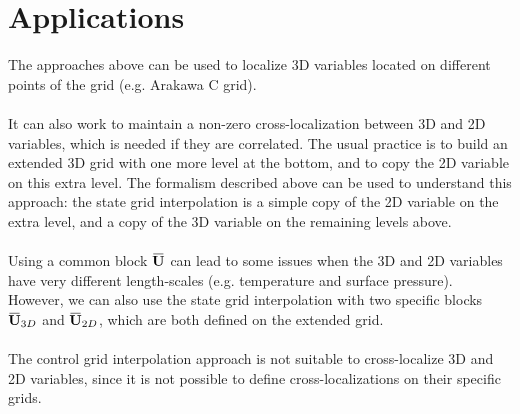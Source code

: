 \documentclass[12pt]{scrartcl}
\newcommand{\overbar}[1]{\mkern 1.5mu\overline{\mkern-1.5mu#1\mkern-1.5mu}\mkern 1.5mu}
\begin{document}
\section{Applications}
The approaches above can be used to localize 3D variables located on different points of the grid (e.g. Arakawa C grid).\\
$  $\\
It can also work to maintain a non-zero cross-localization between 3D and 2D variables, which is needed if they are correlated. The usual practice is to build an extended 3D grid with one more level at the bottom, and to copy the 2D variable on this extra level. The formalism described above can be used to understand this approach: the state grid interpolation is a simple copy of the 2D variable on the extra level, and a copy of the 3D variable on the remaining levels above.\\
$  $\\
Using a common block $\overbar{\mathbf{U}}$ can lead to some issues when the 3D and 2D variables have very different length-scales (e.g. temperature and surface pressure). However, we can also use the state grid interpolation with two specific blocks $\overbar{\mathbf{U}}_{3D}$ and $\overbar{\mathbf{U}}_{2D}$, which are both defined on the extended grid.\\
$  $\\
The control grid interpolation approach is not suitable to cross-localize 3D and 2D variables, since it is not possible to define cross-localizations on their specific grids.

\clearpage



\end{document}
